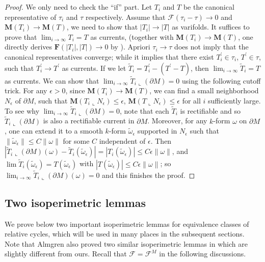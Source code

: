 \documentclass[10pt]{amsart}
\theoremstyle{definition}
\theoremstyle{remark}
\numberwithin{equation}{section}
\newcommand{\F}{\mathcal{F}}
\newcommand{\lc}{\llcorner}
\newcommand{\ep}{\epsilon}
\newcommand{\pr}{\prime}
\newcommand{\om}{\omega}
\newcommand{\ti}{\tilde}
\newcommand{\M}{\mathbf{M}}
\newcommand{\mF}{\mathbf{F}}
\begin{document}
\begin{proof}
We only need to check the ``if'' part. Let $T_i$ and $T$ be the canonical representative of $\tau_i$ and $\tau$ respectively. Assume that $\F(\tau_i-\tau) \to 0$ and $\M(T_i)\to \M(T)$, we need to show that $|T_i|\to |T|$ as varifolds. It suffices to prove that $\lim_{i\rightarrow\infty}T_i=T$ as currents, (together with $\M(T_i)\to \M(T)$, one directly derives $\mF(|T_i|, |T|)\to 0$ by \cite[2.1(18)(f)]{Pitts}). Apriori $\tau_i\to\tau$ does not imply that the canonical representatives converge; while it implies that there exist $T_i^{\pr}\in\tau_i$, $T^{\pr}\in\tau$, such that $T_i^{\pr}\to T^{\pr}$ as currents. If we let $\ti{T}_i=T_i^{\pr}-(T^{\pr}-T)$, then $\lim_{i \to \infty} \ti{T}_i=T$ as currents. We can show that $\lim_{i\rightarrow\infty}\ti{T}_i\lc (\partial M)=0$ using the following cutoff trick. For any $\ep>0$, since $\M(T_i)\to\M(T)$, we can find a small neighborhood $N_{\ep}$ of $\partial M$, such that $\M(T_i\lc N_{\ep})\leq \ep$, $\M(T\lc N_{\ep})\leq \ep$ for all $i$ sufficiently large. 
To see why $\lim_{i\rightarrow\infty}\ti{T}_i\lc (\partial M)=0$, note that each $\ti{T}_i$ is rectifiable and so $\ti{T}_i \lc (\partial M)$ is also a rectifiable current in $\partial M$. Moreover, for any $k$-form $\om$ on $\partial M$, one can extend it to a smooth $k$-form $\ti{\om}_{\ep}$ supported in $N_{\ep}$ such that $\|\ti{\om}_{\ep}\|\leq C\|\om\|$ for some $C$ independent of $\ep$. Then $|\ti{T}_i\lc(\partial M)(\om)-\ti{T}_i(\ti{\om}_{\ep})|=|T_i(\ti{\om}_{\ep})|\leq C\ep\|\om\|$, and $\lim\ti{T}_i(\ti{\om}_{\ep})=T(\ti{\om}_{\ep})$ with $|T(\ti{\om}_{\ep})|\leq C\ep\|\om\|$; so $\lim_{i \to \infty} \ti{T}_i\lc(\partial M)(\om)=0$ and this finishes the proof.
\end{proof}



\subsection{Two isoperimetric lemmas}
\label{SS:isoperimetic}

We prove below two important isoperimetric lemmas for equivalence classes of relative cycles, which will be used in many places in the subsequent sections. Note that Almgren also proved two similar isoperimetric lemmas in \cite{Almgren62} which are slightly different from ours. Recall that $\F=\F^M$ in the following discussions.
\end{document}
